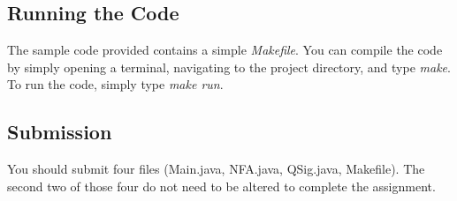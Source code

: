\documentclass[11pt]{article}
\begin{document}
\subsection*{Running the Code}

The sample code provided contains a simple \emph{Makefile}. You can compile the code by simply opening a terminal, navigating to the project directory, and type \emph{make}. To run the code, simply type \emph{make run}.

\subsection*{Submission}

You should submit four files (Main.java, NFA.java, QSig.java, Makefile). The second two of those four do not need to be altered to complete the assignment.
\end{document}
